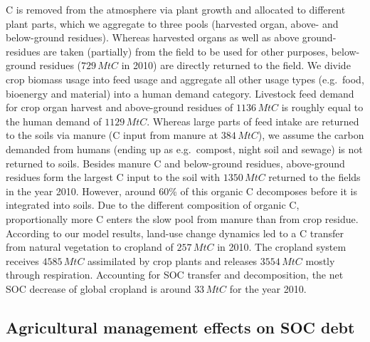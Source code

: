 \documentclass[gc, manuscript]{copernicus}
\begin{document}
C is removed from the atmosphere via plant growth and allocated to different plant parts, which we aggregate to three pools (harvested organ, above- and below-ground residues). Whereas harvested organs as well as above ground-residues are taken (partially) from the field to be used for other purposes, below-ground residues (\(729\,\unit{MtC}\) in 2010) are directly returned to the field. We divide crop biomass usage into feed usage and aggregate all other usage types (e.g.~food, bioenergy and material) into a human demand category. Livestock feed demand for crop organ harvest and above-ground residues of \(1136\,\unit{MtC}\) is roughly equal to the human demand of \(1129\,\unit{MtC}\). Whereas large parts of feed intake are returned to the soils via manure (C input from manure at \(384\,\unit{MtC}\)), we assume the carbon demanded from humans (ending up as e.g.~compost, night soil and sewage) is not returned to soils. Besides manure C and below-ground residues, above-ground residues form the largest C input to the soil with \(1350\,\unit{MtC}\) returned to the fields in the year 2010. However, around 60\% of this organic C decomposes before it is integrated into soils. Due to the different composition of organic C, proportionally more C enters the slow pool from manure than from crop residue.
According to our model results, land-use change dynamics led to a C transfer from natural vegetation to cropland of \(257\,\unit{MtC}\) in 2010. The cropland system receives \(4585\,\unit{MtC}\) assimilated by crop plants and releases \(3554\,\unit{MtC}\) mostly through respiration. Accounting for SOC transfer and decomposition, the net SOC decrease of global cropland is around \(33\,\unit{MtC}\) for the year 2010.

\hypertarget{agricultural-management-effects-on-soc-debt}{%
\subsection{Agricultural management effects on SOC debt}\label{agricultural-management-effects-on-soc-debt}}
\end{document}
